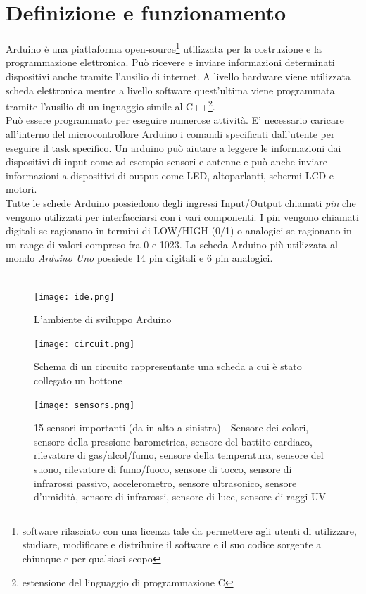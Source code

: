 \documentclass[a4paper,titlepage]{report}
\begin{document}
\section{Definizione e funzionamento}
Arduino è una piattaforma open-source\footnote{software rilasciato con una licenza tale da permettere agli utenti di utilizzare, studiare, modificare e distribuire il software e il suo codice sorgente a chiunque e per qualsiasi scopo} utilizzata per la costruzione e la programmazione elettronica. Può ricevere e inviare informazioni determinati dispositivi anche tramite l'ausilio di internet. A livello hardware viene utilizzata scheda elettronica mentre a livello software quest'ultima viene programmata tramite l'ausilio di un inguaggio simile al C++\footnote{estensione del linguaggio di programmazione C}.\\
Può essere programmato per eseguire numerose attività. E' necessario caricare all'interno del microcontrollore Arduino i comandi specificati dall'utente per eseguire il task specifico. Un arduino può aiutare a leggere le informazioni dai dispositivi di input come ad esempio sensori e antenne e può anche inviare informazioni a dispositivi di output come LED, altoparlanti, schermi LCD e motori\cite{Badamasi:TheworkingprincipleofanArduino}.\\
Tutte le schede Arduino possiedono degli ingressi Input/Output chiamati {\itshape pin} che vengono utilizzati per interfacciarsi con i vari componenti. I pin vengono chiamati digitali se ragionano in termini di LOW/HIGH (0/1) o analogici se ragionano in un range di valori compreso fra 0 e 1023. La scheda Arduino più utilizzata al mondo {\itshape Arduino Uno} possiede 14 pin digitali e 6 pin analogici\cite{Caccavale:NozionisuInputOutputArduino}. \\\\
\begin{figure}[h]
\centering
\texttt{[image: ide.png]}
\caption{L'ambiente di sviluppo Arduino}
\end{figure}
\begin{figure}[h]
\centering
\texttt{[image: circuit.png]}
\caption{Schema di un circuito rappresentante una scheda a cui è stato collegato un bottone}
\end{figure}
\begin{figure}[h]
\centering
\texttt{[image: sensors.png]}
\caption{15 sensori importanti (da in alto a sinistra) - Sensore dei colori, sensore della pressione barometrica, sensore del battito cardiaco, rilevatore di gas/alcol/fumo, sensore della temperatura, sensore del suono, rilevatore di fumo/fuoco, sensore di tocco, sensore di infrarossi passivo, accelerometro, sensore ultrasonico, sensore d'umidità, sensore di infrarossi, sensore di luce, sensore di raggi UV}
\end{figure}
\end{document}
